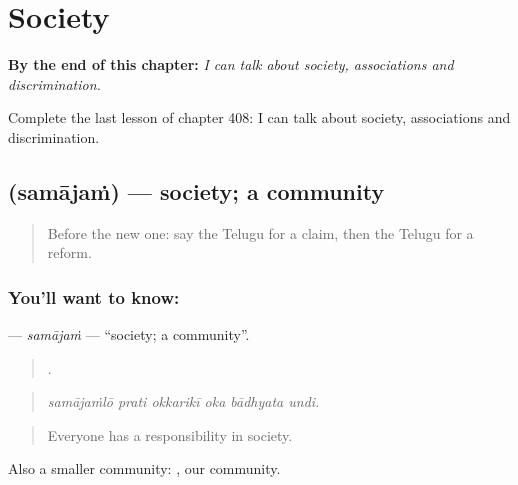 
\chapter{Society}
\label{ch:te-society}

\begin{chapteropening}
\textbf{By the end of this chapter:} \emph{I can talk about society, associations and discrimination.}

Complete the last lesson of chapter 408: I can talk about society, associations and discrimination.
\end{chapteropening}

\section[\texorpdfstring{\te{సమాజం} (samājaṁ)}{సమాజం (samājaṁ)}]{ (samājaṁ) — society; a community}

\label{lesson:TE-C408-samajam}



\begin{quote}
Before the new one: say the Telugu for a claim, then the Telugu for a reform.
\end{quote}

\subsection*{You'll want to know: }
\textbf{} — \emph{samājaṁ} — \textquotedblleft{}society; a community\textquotedblright{}.

\begin{quote}
     .
\end{quote}

\begin{quote}
\emph{samājaṁlō prati okkarikī oka bādhyata undi.}
\end{quote}

\begin{quote}
Everyone has a responsibility in society.
\end{quote}

Also a smaller community:  , our community.

